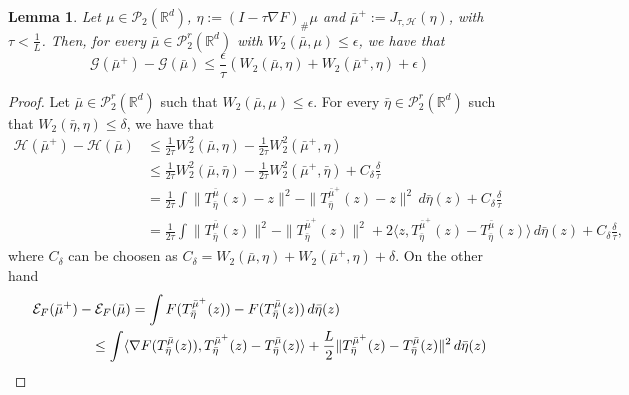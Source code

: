 \documentclass[11pt]{article}
\newtheorem{lemma}[theorem]{Lemma}
\newcommand{\cP}{\mathcal{P}}
\newcommand{\R}{\mathbb{R}}
\numberwithin{equation}{section}
\begin{document}
\begin{lemma}\label{lem:second_ingredient_PG}
	Let $\mu \in \cP_2(\R^d)$, $\eta := (I-\tau \nabla F)_{\#}\mu$ and $\bar{\mu}^+:=J_{\tau,\mathcal{H}}(\eta)$, with $\tau < \frac{1}{L}$. Then, for every $\bar \mu \in \cP_2^r(\R^d)$ with $W_2(\bar \mu, \mu)\leq \epsilon$,  we have that
	\begin{equation}\label{eq:lem_second_ingredient_PG}
		\mathcal{G}(\bar \mu^+) - \mathcal{G}(\bar \mu) \leq  \frac{\epsilon}{\tau} (W_2(\bar \mu, \eta)+W_2(\bar \mu^+, \eta)+\epsilon)
	\end{equation}
\end{lemma}
\begin{proof}
	Let $\bar \mu \in \cP_2^r(\R^d)$ such that $W_2(\bar \mu, \mu)\leq \epsilon$. For every $\bar \eta\in \cP_2^r(\R^d)$ such that $W_2(\bar \eta, \eta)\leq \delta$, we have that
	\begin{equation*}
		\begin{aligned}
			\mathcal{H}(\bar{\mu}^+)-\mathcal{H}(\bar{\mu}) & \leq \frac{1}{2\tau}W_2^2(\bar \mu,\eta)-\frac{1}{2\tau}W_2^2(\bar \mu^+,\eta)\\
			& \leq \frac{1}{2\tau}W_2^2(\bar \mu,\bar \eta) - \frac{1}{2\tau} W_2^2(\bar \mu^+, \bar \eta) + C_\delta\frac{\delta}{\tau}\\
			& = \frac{1}{2\tau}\int \|T_{\bar \eta}^{\bar \mu}(z) - z\|^2 - \|T_{\bar \eta}^{\bar \mu^+}(z) - z\|^2 \, d\bar \eta (z) + C_\delta \frac{\delta}{\tau}\\
			& = \frac{1}{2\tau}\int \|T_{\bar \eta}^{\bar \mu}(z)\|^2 - \|T_{\bar \eta}^{\bar \mu^+}(z)\|^2 + 2\langle z, T_{\bar \eta}^{\bar \mu^+}(z)-T_{\bar \eta}^{\bar \mu}(z) \rangle \, d\bar \eta (z) + C_\delta \frac{\delta}{\tau},
		\end{aligned}
	\end{equation*}
	where $C_\delta$ can be choosen as $C_\delta=W_2(\bar \mu, \eta)+W_2(\bar \mu^+,\eta)+\delta$. On the other hand
	\begin{equation*}
		\begin{aligned}
			\mathcal{E}_F(\bar{\mu}^+)-\mathcal{E}_F(\bar{\mu})& = \int  F(T_{\bar \eta}^{\bar \mu^+}(z))-F(T_{\bar \eta}^{\bar \mu}(z)) \, d \bar \eta (z) \\
			& \hspace{-1cm}\leq \int \langle \nabla F(T_{\bar \eta}^{\bar \mu}(z)), T_{\bar \eta}^{\bar \mu^+}(z) - T_{\bar \eta}^{\bar \mu}(z) \rangle + \frac{L}{2} \|T_{\bar \eta}^{\bar \mu^+}(z)-T_{\bar \eta}^{\bar \mu}(z)\|^2 \, d \bar \eta (z)\\

\end{aligned}
\end{equation*}
\end{proof}
\end{document}
